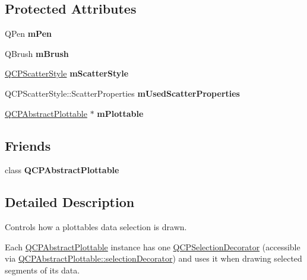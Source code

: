 \subsection*{Protected Attributes}
\begin{DoxyCompactItemize}
\item 
\mbox{\label{classQCPSelectionDecorator_a684a691c146a5bac927c0146bd28d557}} 
Q\+Pen {\bfseries m\+Pen}
\item 
\mbox{\label{classQCPSelectionDecorator_a4e3a3a01fdec5b018c0c59a0b6ae9f70}} 
Q\+Brush {\bfseries m\+Brush}
\item 
\mbox{\label{classQCPSelectionDecorator_a5b822197a1bf802c5cf8c3dc43ca549a}} 
\hyperlink{classQCPScatterStyle}{Q\+C\+P\+Scatter\+Style} {\bfseries m\+Scatter\+Style}
\item 
\mbox{\label{classQCPSelectionDecorator_acb4f6af085283c9ce7d5c168fb53e855}} 
Q\+C\+P\+Scatter\+Style\+::\+Scatter\+Properties {\bfseries m\+Used\+Scatter\+Properties}
\item 
\mbox{\label{classQCPSelectionDecorator_a25250a1d29b0723c4fa59a97e62f5758}} 
\hyperlink{classQCPAbstractPlottable}{Q\+C\+P\+Abstract\+Plottable} $\ast$ {\bfseries m\+Plottable}
\end{DoxyCompactItemize}
\subsection*{Friends}
\begin{DoxyCompactItemize}
\item 
\mbox{\label{classQCPSelectionDecorator_a53cf0e76aca814550c796fed79e345d6}} 
class {\bfseries Q\+C\+P\+Abstract\+Plottable}
\end{DoxyCompactItemize}


\subsection{Detailed Description}
Controls how a plottable\textquotesingle{}s data selection is drawn. 

Each \hyperlink{classQCPAbstractPlottable}{Q\+C\+P\+Abstract\+Plottable} instance has one \hyperlink{classQCPSelectionDecorator}{Q\+C\+P\+Selection\+Decorator} (accessible via \hyperlink{classQCPAbstractPlottable_a7861518e47ca0c6a0c386032c2db075e}{Q\+C\+P\+Abstract\+Plottable\+::selection\+Decorator}) and uses it when drawing selected segments of its data.

